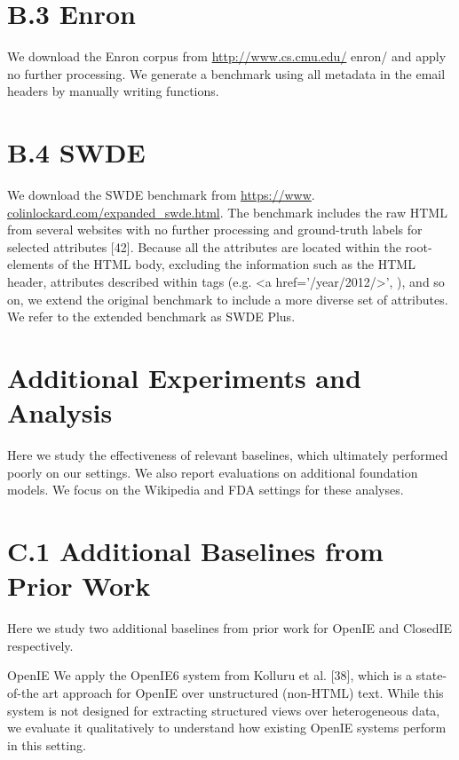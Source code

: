 \documentclass[10pt]{article}
\begin{document}
\section{B.3 Enron}
We download the Enron corpus from \href{http://www.cs.cmu.edu/}{http://www.cs.cmu.edu/} enron/ and apply no further processing. We generate a benchmark using all metadata in the email headers by manually writing functions.

\section{B.4 SWDE}
We download the SWDE benchmark from \href{https://www}{https://www}. \href{http://colinlockard.com/expanded_swde.html}{colinlockard.com/expanded\_swde.html}. The benchmark includes the raw HTML from several websites with no further processing and ground-truth labels for selected attributes [42]. Because all the attributes are located within the root-elements of the HTML body, excluding the information such as the HTML header, attributes described within tags (e.g. <a href='/year/2012/>', ), and so on, we extend the original benchmark to include a more diverse set of attributes. We refer to the extended benchmark as SWDE Plus.

\section{Additional Experiments and Analysis}
Here we study the effectiveness of relevant baselines, which ultimately performed poorly on our settings. We also report evaluations on additional foundation models. We focus on the Wikipedia and FDA settings for these analyses.

\section{C.1 Additional Baselines from Prior Work}
Here we study two additional baselines from prior work for OpenIE and ClosedIE respectively.

OpenIE We apply the OpenIE6 system from Kolluru et al. [38], which is a state-of-the art approach for OpenIE over unstructured (non-HTML) text. While this system is not designed for extracting structured views over heterogeneous data, we evaluate it qualitatively to understand how existing OpenIE systems perform in this setting.
\end{document}
